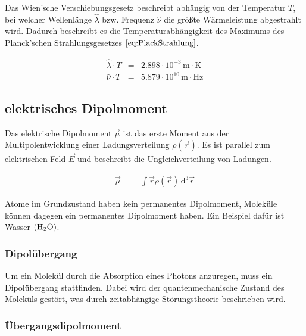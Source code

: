 \documentclass[12pt,a4paper]{scrartcl}
\numberwithin{equation}{section} %
\renewcommand{\[}{} %
\renewcommand{\]}{\noindent} %
\begin{document}
Das Wien'sche Verschiebungsgesetz beschreibt abhängig von der Temperatur \(T\), bei welcher Wellenlänge \(\hat{\lambda}\) bzw. Frequenz \(\hat{\nu}\) die größte Wärmeleistung abgestrahlt wird. Dadurch beschreibt es die Temperaturabhängigkeit des Maximums des Planck'schen Strahlungsgesetzes \(\eqref{eq:PlackStrahlung}\).

\[
\begin{eqnarray}
    \hat{\lambda}\cdot T &=& 2.898\cdot10^{-3}\mathrm{\,m\cdot K}
        \label{eq:WienLambda}\\
    \hat{\nu}\cdot T &=& 5.879\cdot10^{10} \mathrm{\,m\cdot Hz}
        \label{eq:WienNu}
\end{eqnarray}
\]

\hypertarget{elektrisches-dipolmoment}{%
\subsection{elektrisches Dipolmoment}\label{elektrisches-dipolmoment}}

Das elektrische Dipolmoment \(\vec \mu\) ist das erste Moment aus der Multipolentwicklung einer Ladungsverteilung \(\rho(\vec r)\). \cite{Dipolmoment}
Es ist parallel zum elektrischen Feld \(\vec E\) und beschreibt die Ungleichverteilung von Ladungen.

\[
\begin{eqnarray}
    \vec \mu &=& \int \vec r \rho(\vec r) \,\mathrm d^3\vec r
\end{eqnarray}
\]

\noindent
Atome im Grundzustand haben kein permanentes Dipolmoment, Moleküle können dagegen ein permanentes Dipolmoment haben. Ein Beispiel dafür ist Wasser \((\ce{H_2O})\).

\hypertarget{dipoluxfcbergang}{%
\subsubsection{Dipolübergang}\label{dipoluxfcbergang}}

Um ein Molekül durch die Absorption eines Photons anzuregen, muss ein Dipolübergang stattfinden. Dabei wird der quantenmechanische Zustand des Moleküls gestört, was durch zeitabhängige Störungstheorie beschrieben wird. \cite{Hinderer}

\hypertarget{uxfcbergangsdipolmoment}{%
\subsubsection{Übergangsdipolmoment}\label{uxfcbergangsdipolmoment}}
\end{document}
